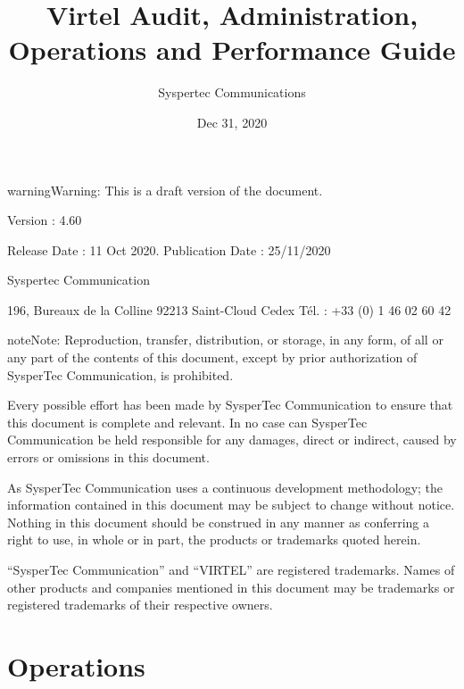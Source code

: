 \documentclass[letterpaper,10pt,english]{sphinxmanual}
\title{Virtel Audit, Administration, Operations and Performance Guide}
\date{Dec 31, 2020}
\author{Syspertec Communications}
\begin{document}
\pagestyle{empty}
\sphinxmaketitle
\pagestyle{plain}
\sphinxtableofcontents
\pagestyle{normal}
\label{\detokenize{audit_operations_ and_performance::doc}}




\begin{sphinxadmonition}{warning}{Warning:}
This is a draft version of the document.
\end{sphinxadmonition}

Version : 4.60

Release Date : 11 Oct 2020. Publication Date : 25/11/2020

Syspertec Communication

196, Bureaux de la Colline 92213 Saint-Cloud Cedex Tél. : +33 (0) 1 46 02 60 42


\begin{sphinxadmonition}{note}{Note:}
Reproduction, transfer, distribution, or storage, in any form, of all or any part of
the contents of this document, except by prior authorization of SysperTec
Communication, is prohibited.

Every possible effort has been made by SysperTec Communication to ensure that this document
is complete and relevant. In no case can SysperTec Communication be held responsible for
any damages, direct or indirect, caused by errors or omissions in this document.

As SysperTec Communication uses a continuous development methodology; the information
contained in this document may be subject to change without notice. Nothing in this
document should be construed in any manner as conferring a right to use, in whole or in
part, the products or trademarks quoted herein.

“SysperTec Communication” and “VIRTEL” are registered trademarks. Names of other products
and companies mentioned in this document may be trademarks or registered trademarks of
their respective owners.
\end{sphinxadmonition}


\chapter{Operations}
\label{\detokenize{audit_operations_ and_performance:operations}}\label{\detokenize{audit_operations_ and_performance:v460ap-introduction}}
\ignorespaces 
\end{document}
